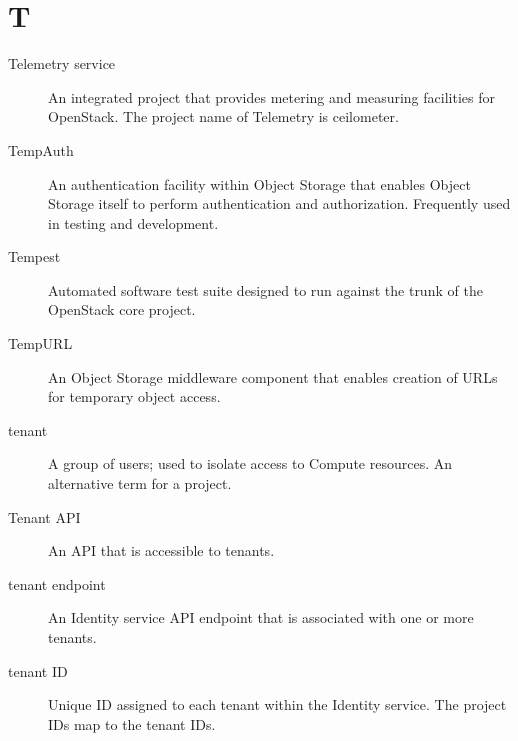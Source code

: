 \documentclass[letterpaper,10pt,english]{sphinxmanual}
\begin{document}
\section{T}
\label{_source/glossary:t}\begin{description}
\item[{Telemetry service}] \leavevmode{}\label{_source/glossary:term-telemetry-service}
An integrated project that provides metering and measuring
facilities for OpenStack. The project name of Telemetry is
ceilometer.

\item[{TempAuth}] \leavevmode{}\label{_source/glossary:term-tempauth}
An authentication facility within Object Storage that enables
Object Storage itself to perform authentication and authorization.
Frequently used in testing and development.

\item[{Tempest}] \leavevmode{}\label{_source/glossary:term-tempest}
Automated software test suite designed to run against the trunk
of the OpenStack core project.

\item[{TempURL}] \leavevmode{}\label{_source/glossary:term-tempurl}
An Object Storage middleware component that enables creation of
URLs for temporary object access.

\item[{tenant}] \leavevmode{}\label{_source/glossary:term-tenant}
A group of users; used to isolate access to Compute resources.
An alternative term for a project.

\item[{Tenant API}] \leavevmode{}\label{_source/glossary:term-tenant-api}
An API that is accessible to tenants.

\item[{tenant endpoint}] \leavevmode{}\label{_source/glossary:term-tenant-endpoint}
An Identity service API endpoint that is associated with one or
more tenants.

\item[{tenant ID}] \leavevmode{}\label{_source/glossary:term-tenant-id}
Unique ID assigned to each tenant within the Identity service.
The project IDs map to the tenant IDs.


\end{description}
\end{document}
